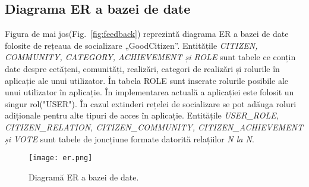 \subsection{Diagrama ER a bazei de date}
    Figura de mai jos(Fig.~\ref{fig:feedback}) reprezintă diagrama ER a bazei de date folosite de rețeaua de 
    socializare „GoodCitizen”.
    Entitățile \textit{CITIZEN, COMMUNITY, CATEGORY, ACHIEVEMENT și ROLE} sunt tabele ce conțin date
    despre cetățeni, comunități, realizări, categori de realizări și rolurile în aplicație ale unui utilizator.
    În tabela ROLE sunt inserate rolurile posibile ale unui utilizator în aplicație. În 
    implementarea actuală a aplicației este folosit un singur rol("USER"). În cazul extinderi 
    rețelei de socializare se pot adăuga roluri adiționale pentru alte tipuri de acces în aplicație.
    Entitățile \textit{USER\_ROLE, CITIZEN\_RELATION, CITIZEN\_COMMUNITY, CITIZEN\_ACHIEVEMENT și VOTE}
    sunt tabele de joncțiune formate datorită 
    relațiilor \textit{N la N}. 

    \begin{figure}[h]
    \texttt{[image: er.png]}
    \centering
    \caption{Diagramă ER a bazei de date.}
    \label{fig:er}
    \end{figure}    